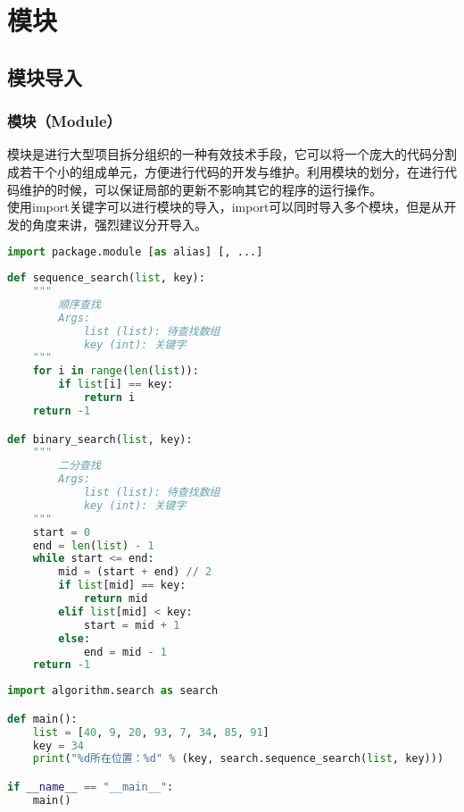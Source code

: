 \chapter{模块}

\section{模块导入}

\subsection{模块（Module）}

模块是进行大型项目拆分组织的一种有效技术手段，它可以将一个庞大的代码分割成若干个小的组成单元，方便进行代码的开发与维护。利用模块的划分，在进行代码维护的时候，可以保证局部的更新不影响其它的程序的运行操作。\\

使用import关键字可以进行模块的导入，import可以同时导入多个模块，但是从开发的角度来讲，强烈建议分开导入。

\vspace{-0.5cm}

\begin{lstlisting}[language=Python]
import package.module [as alias] [, ...]
\end{lstlisting}

\vspace{0.5cm}


\begin{lstlisting}[language=Python, title=algorithm/search.py]
def sequence_search(list, key):
    """
        顺序查找
        Args:
            list (list): 待查找数组
            key (int): 关键字
    """
    for i in range(len(list)):
        if list[i] == key:
            return i
    return -1

def binary_search(list, key):
    """
        二分查找
        Args:
            list (list): 待查找数组
            key (int): 关键字
    """
    start = 0
    end = len(list) - 1
    while start <= end:
        mid = (start + end) // 2
        if list[mid] == key:
            return mid
        elif list[mid] < key:
            start = mid + 1
        else:
            end = mid - 1
    return -1
\end{lstlisting}

\begin{lstlisting}[language=Python, title=import\_as.py]
import algorithm.search as search

def main():
    list = [40, 9, 20, 93, 7, 34, 85, 91]
    key = 34
    print("%d所在位置：%d" % (key, search.sequence_search(list, key)))

if __name__ == "__main__":
    main()
\end{lstlisting}

